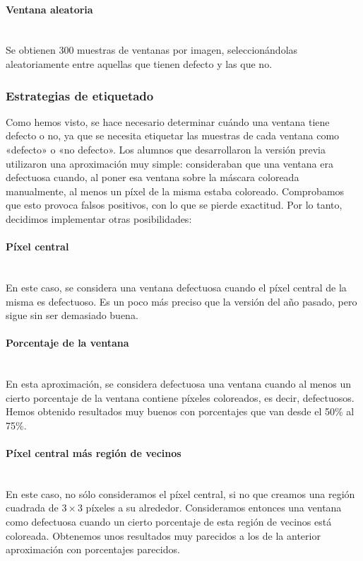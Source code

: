 \paragraph*{Ventana aleatoria}\mbox{} \\
\indent Se obtienen 300 muestras de ventanas por imagen, seleccionándolas aleatoriamente entre aquellas que tienen defecto y las que no.

\subsubsection{Estrategias de etiquetado}
Como hemos visto, se hace necesario determinar cuándo una ventana tiene defecto o no, ya que se necesita etiquetar las muestras de cada ventana como «defecto» o «no defecto». Los alumnos que desarrollaron la versión previa utilizaron una aproximación muy simple: consideraban que una ventana era defectuosa cuando, al poner esa ventana sobre la máscara coloreada manualmente, al menos un píxel de la misma estaba coloreado. Comprobamos que esto provoca falsos positivos, con lo que se pierde exactitud. Por lo tanto, decidimos implementar otras posibilidades:

\paragraph*{Píxel central}\mbox{} \\
\indent En este caso, se considera una ventana defectuosa cuando el píxel central de la misma es defectuoso. Es un poco más preciso que la versión del año pasado, pero sigue sin ser demasiado buena.

\paragraph*{Porcentaje de la ventana}\mbox{} \\
\indent En esta aproximación, se considera defectuosa una ventana cuando al menos un cierto porcentaje de la ventana contiene píxeles coloreados, es decir, defectuosos. Hemos obtenido resultados muy buenos con porcentajes que van desde el 50\% al 75\%.

\paragraph*{Píxel central más región de vecinos}\mbox{} \\
\indent En este caso, no sólo consideramos el píxel central, si no que creamos una región cuadrada de $3 \times 3$ píxeles a su alrededor. Consideramos entonces una ventana como defectuosa cuando un cierto porcentaje de esta región de vecinos está coloreada. Obtenemos unos resultados muy parecidos a los de la anterior aproximación con porcentajes parecidos.

